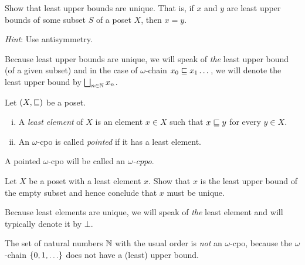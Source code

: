 \begin{exercise}\label{exer:least-upper-bounds-are-unique}
  Show that least upper bounds are unique. That is, if \(x\) and \(y\) are least
  upper bounds of some subset \(S\) of a poset \(X\), then \(x = y\).

  \emph{Hint}: Use antisymmetry.
\end{exercise}

Because least upper bounds are unique, we will speak of \emph{the} least upper
bound (of a given subset) and in the case of \(\omega\)-chain
\(x_0 \sqsubseteq x_1 \dots\), we will denote the least upper bound by
\(\bigsqcup_{n \in \mathbb N}x_n\).

\begin{definition}
  Let \((X,{\sqsubseteq})\) be a poset.
  \begin{enumerate}[(i)]
  \item A \emph{least element} of \(X\) is an element \(x \in X\) such that
    \(x \sqsubseteq y\) for every \(y \in X\).
  \item An \(\omega\)-cpo is called \emph{pointed} if it has a least element.
  \end{enumerate}
  A pointed \(\omega\)-cpo will be called an \emph{\(\omega\)-cppo}.
\end{definition}

\begin{exercise}\label{exer:least-element-is-unique}
  Let \(X\) be a poset with a least element \(x\). Show that \(x\) is the least
  upper bound of the empty subset and hence conclude that \(x\) must be unique.
\end{exercise}

Because least elements are unique, we will speak of \emph{the} least element and
will typically denote it by \(\bot\).

\begin{example}
  The set of natural numbers \(\mathbb N\) with the usual order is \emph{not} an
  \(\omega\)-cpo, because the \(\omega\)-chain
  \(\set{0,1,\dots}\) does not have a (least) upper bound.
\end{example}

